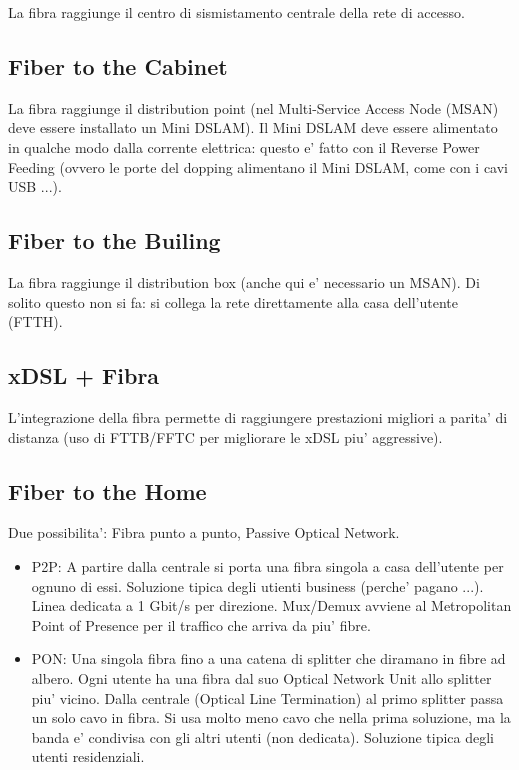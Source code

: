 La fibra raggiunge il centro di sismistamento centrale della rete di accesso.


\subsection{Fiber to the Cabinet}

La fibra raggiunge il distribution point (nel Multi-Service Access Node (MSAN) deve essere installato un Mini DSLAM).
Il Mini DSLAM deve essere alimentato in qualche modo dalla corrente elettrica: questo e' fatto con il Reverse Power Feeding (ovvero le porte del dopping alimentano il Mini DSLAM, come con i cavi USB ...).


\subsection{Fiber to the Builing}

La fibra raggiunge il distribution box (anche qui e' necessario un MSAN).
Di solito questo non si fa: si collega la rete direttamente alla casa dell'utente (FTTH).


\subsection{xDSL + Fibra}

L'integrazione della fibra permette di raggiungere prestazioni migliori a parita' di distanza (uso di FTTB/FFTC per migliorare le xDSL piu' aggressive).

\subsection{Fiber to the Home}

Due possibilita': Fibra punto a punto, Passive Optical Network.

\begin{itemize}
  \item P2P: A partire dalla centrale si porta una fibra singola a casa dell'utente per ognuno di essi. Soluzione tipica degli utienti business (perche' pagano ...). Linea dedicata a 1 Gbit/s per direzione. Mux/Demux avviene al Metropolitan Point of Presence per il traffico che arriva da piu' fibre.
  \item PON: Una singola fibra fino a una catena di splitter che diramano in fibre ad albero. Ogni utente ha una fibra dal suo Optical Network Unit allo splitter piu' vicino. Dalla centrale (Optical Line Termination) al primo splitter passa un solo cavo in fibra. Si usa molto meno cavo che nella prima soluzione, ma la banda e' condivisa con gli altri utenti (non dedicata). Soluzione tipica degli utenti residenziali.
\end{itemize}

